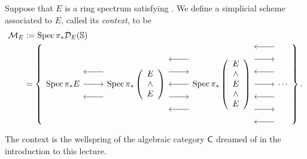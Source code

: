 \begin{definition}
Suppose that $E$ is a ring spectrum satisfying {\CH}.  We define a simplicial scheme associated to $E$, called its \textit{context}, to be
\begin{align*}
\mathcal{M}_E & := \Spec \pi_* \sheaf D_E(\S) \\
& = \left\{
\begin{tikzcd}[ampersand replacement=\&]
\Spec \pi_* E \arrow{r} \arrow[leftarrow,shift left=\baselineskip]{r} \arrow[leftarrow,shift right=\baselineskip]{r} \&
\Spec \pi_* \left( \begin{array}{c} E \\ \sm \\ E \end{array} \right) \arrow[leftarrow, shift left=(2*\baselineskip)]{r} \arrow[shift left=\baselineskip]{r} \arrow[leftarrow]{r} \arrow[shift right=\baselineskip]{r} \arrow[leftarrow, shift right=(2*\baselineskip)]{r} \&
\Spec \pi_* \left( \begin{array}{c} E \\ \sm \\ E \\ \sm \\ E \end{array} \right) \arrow[leftarrow, shift left=(3*\baselineskip)]{r} \arrow[shift left=(2*\baselineskip)]{r} \arrow[leftarrow, shift left=\baselineskip]{r} \arrow{r} \arrow[leftarrow, shift right=\baselineskip]{r} \arrow[shift right=(2*\baselineskip)]{r} \arrow[leftarrow, shift right=(3*\baselineskip)]{r} \&
\cdots
\end{tikzcd}
\right\}.
\end{align*}

\end{definition}

The context is the wellspring of the algebraic category $\mathsf{C}$ dreamed of in the introduction to this lecture.

